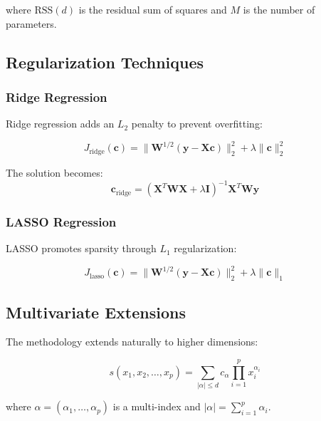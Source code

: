 \documentclass[12pt]{article}
\renewcommand{\vec}[1]{\mathbf{#1}}
\begin{document}
where $\text{RSS}(d)$ is the residual sum of squares and $M$ is the number of parameters.

\subsection{Regularization Techniques}

\subsubsection{Ridge Regression}

Ridge regression adds an $L_2$ penalty to prevent overfitting:

\begin{equation}
    J_{\text{ridge}}(\vec{c}) = \|\mathbf{W}^{1/2}(\vec{y} - \mathbf{X}\vec{c})\|_2^2 + \lambda \|\vec{c}\|_2^2
\end{equation}

The solution becomes:
\begin{equation}
    \vec{c}_{\text{ridge}} = (\mathbf{X}^T \mathbf{W} \mathbf{X} + \lambda \mathbf{I})^{-1} \mathbf{X}^T \mathbf{W} \vec{y}
\end{equation}

\subsubsection{LASSO Regression}

LASSO promotes sparsity through $L_1$ regularization:

\begin{equation}
    J_{\text{lasso}}(\vec{c}) = \|\mathbf{W}^{1/2}(\vec{y} - \mathbf{X}\vec{c})\|_2^2 + \lambda \|\vec{c}\|_1
\end{equation}

\subsection{Multivariate Extensions}

The methodology extends naturally to higher dimensions:

\begin{equation}
    s(x_1, x_2, \ldots, x_p) = \sum_{|\alpha| \leq d} c_{\alpha} \prod_{i=1}^p x_i^{\alpha_i}
\end{equation}

where $\alpha = (\alpha_1, \ldots, \alpha_p)$ is a multi-index and $|\alpha| = \sum_{i=1}^p \alpha_i$.

\newpage
\end{document}
